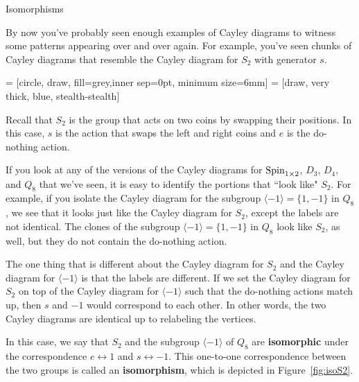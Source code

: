 \begin{section}{Isomorphisms}

By now you've probably seen enough examples of Cayley diagrams to witness some patterns appearing over and over again.  For example, you've seen chunks of Cayley diagrams that resemble the Cayley diagram for \(S_2\) with generator \(s\).

 = [circle, draw, fill=grey,inner sep=0pt, minimum size=6mm]
 = [draw, very thick, blue, stealth-stealth]

\begin{center}
\end{center}

\noindent Recall that \(S_2\) is the group that acts on two coins by swapping their positions.  In this case, \(s\) is the action that swaps the left and right coins and \(e\) is the do-nothing action.  

If you look at any of the versions of the Cayley diagrams for \(\operatorname{Spin}_{1\times 2}\), \(D_3\), \(D_4\), and \(Q_8\) that we've seen, it is easy to identify the portions that ``look like" \(S_2\).  For example, if you isolate the Cayley diagram for the subgroup \(\langle -1\rangle=\{1,-1\}\) in \(Q_8\), we see that it looks just like the Cayley diagram for \(S_2\), except the labels are not identical.  The clones of the subgroup \(\langle -1\rangle=\{1,-1\}\) in \(Q_8\) look like \(S_2\), as well, but they do not contain the do-nothing action.  

The one thing that is different about the Cayley diagram for \(S_2\) and the Cayley diagram for \(\langle -1\rangle\) is that the labels are different.  If we set the Cayley diagram for \(S_2\) on top of the Cayley diagram for \(\langle -1\rangle\) such that the do-nothing actions match up, then \(s\) and \(-1\) would correspond to each other.  In other words, the two Cayley diagrams are identical up to relabeling the vertices.

In this case, we say that \(S_2\) and the subgroup \(\langle -1\rangle\) of \(Q_8\) are \textbf{isomorphic} under the correspondence \(e\leftrightarrow 1\) and \(s\leftrightarrow -1\).  This one-to-one correspondence between the two groups is called an \textbf{isomorphism}, which is depicted in Figure~\ref{fig:isoS2}.
  

\end{section}
